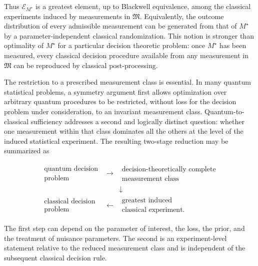 \documentclass{article}
\theoremstyle{named}
\theoremstyle{named1}
\theoremstyle{plain}
\theoremstyle{remark}
\begin{document}
Thus $\mathcal E_{M^\star}$ is a greatest element, up to Blackwell
equivalence, among the classical experiments induced by measurements in
$\mathfrak M$. Equivalently, the outcome distribution of every admissible
measurement can be generated from that of $M^\star$ by a
parameter-independent classical randomization. This notion is stronger than
optimality of $M^\star$ for a particular decision theoretic problem:
once $M^\star$ has been measured, every classical decision procedure
available from any measurement in $\mathfrak M$ can be reproduced by
classical post-processing.

The restriction to a prescribed measurement class is essential. In many
quantum statistical problems, a symmetry argument first
allows optimization over arbitrary quantum procedures to be restricted,
without loss for the decision problem under consideration, to an invariant measurement class. Quantum-to-classical sufficiency addresses
a second and logically distinct question: whether one measurement within
that class dominates all the others at the level of the induced statistical
experiment. The resulting two-stage reduction may be summarized as

$$
\begin{array}{ccc}
\begin{array}{c}
\text{quantum decision}\\[-1mm]
\text{problem}
\end{array}
&
\longrightarrow
&
\begin{array}{c}
\text{decision-theoretically complete}\\[-1mm]
\text{measurement class}
\end{array}
\\[4mm]
&&
\downarrow
\\[4mm]
\begin{array}{c}
\text{classical decision}\\[-1mm]
\text{problem}
\end{array}
&
\longleftarrow
&
\begin{array}{c}
\text{greatest induced}\\[-1mm]
\text{classical experiment}.
\end{array}
\end{array}
$$

The first step can depend on the parameter of interest, the loss, the prior,
and the treatment of nuisance parameters. The second is an experiment-level
statement relative to the reduced measurement class and is independent of
the subsequent classical decision rule.
\end{document}
